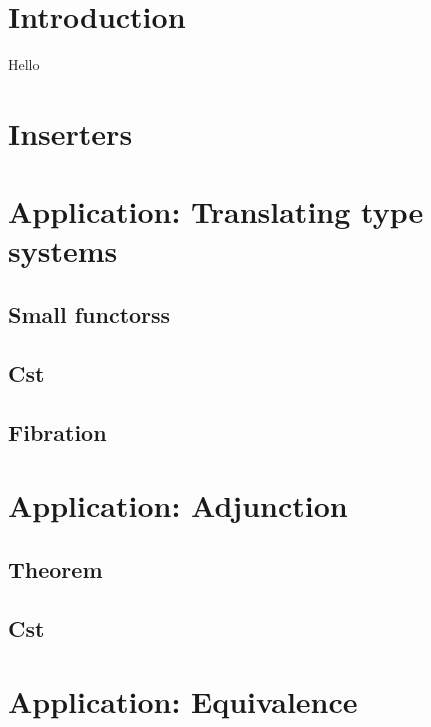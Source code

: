 \documentclass[acmsmall,anonymous,screen,review]{acmart}
\theoremstyle{acmdefinition}
\begin{document}



\maketitle

\section{Introduction}
Hello \cite{Adamek}
\section{Inserters}
\section{Application: Translating type systems}
\subsection{Small functorss}
\subsection{Cst}
\subsection{Fibration}
\section{Application: Adjunction}
\subsection{Theorem}
\subsection{Cst}
\section{Application: Equivalence}


\newpage
\end{document}
